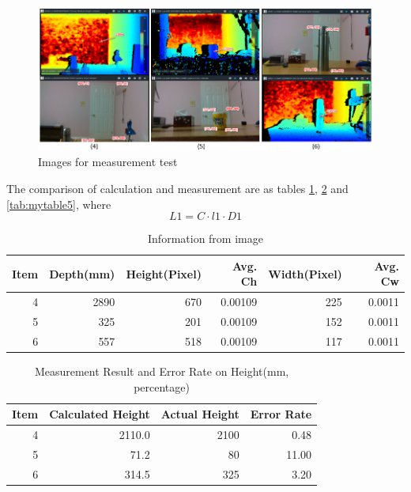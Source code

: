 \documentclass[
  oneside]{ubcthesis}
\begin{document}
\begin{figure}

{\centering \includegraphics[width=0.9\linewidth]{figures/7} 

}

\caption{Images for measurement test}\label{fig:figure7}
\end{figure}



The comparison of calculation and measurement are as tables \ref{tab:mytable3}, \ref{tab:mytable4} and \ref{tab:mytable5}, where \[L1 = C \cdot l1 \cdot D1\]

\begin{table}

\caption{\label{tab:mytable3}Information from image}
\centering
\begin{tabular}[t]{rrrrrr}
\toprule
Item & Depth(mm) & Height(Pixel) & Avg. Ch & Width(Pixel) & Avg. Cw\\
\midrule
4 & 2890 & 670 & 0.00109 & 225 & 0.0011\\
5 & 325 & 201 & 0.00109 & 152 & 0.0011\\
6 & 557 & 518 & 0.00109 & 117 & 0.0011\\
\bottomrule
\end{tabular}
\end{table}

\begin{table}

\caption{\label{tab:mytable4}Measurement Result and Error Rate on Height(mm, percentage)}
\centering
\begin{tabular}[t]{rrrr}
\toprule
Item & Calculated Height & Actual Height & Error Rate\\
\midrule
4 & 2110.0 & 2100 & 0.48\\
5 & 71.2 & 80 & 11.00\\
6 & 314.5 & 325 & 3.20\\
\bottomrule
\end{tabular}
\end{table}
\end{document}
